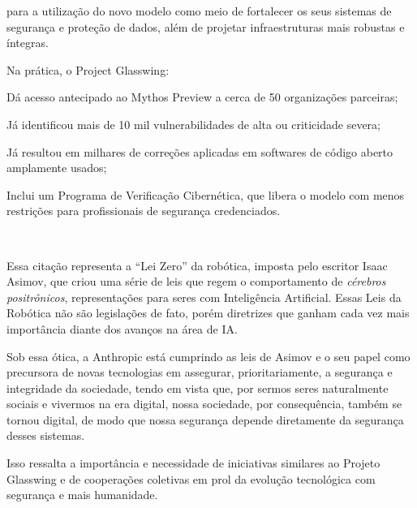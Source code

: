 {para a utilização do novo modelo como meio de fortalecer os seus sistemas de segurança e proteção de dados, além de projetar infraestruturas mais robustas e íntegras.


Na prática, o Project Glasswing:

\begin{hypeitemize}
\item Dá acesso antecipado ao Mythos Preview a cerca de 50 organizações parceiras;
\item Já identificou mais de 10 mil vulnerabilidades de alta ou criticidade severa;
\item Já resultou em milhares de correções aplicadas em softwares de código aberto amplamente usados;
\item Inclui um Programa de Verificação Cibernética, que libera o modelo com menos restrições para profissionais de segurança credenciados.
\end{hypeitemize}\
  
\subtitle{Uma reflexão inspirada em Asimov}


Essa citação representa a ``Lei Zero'' da robótica, imposta pelo escritor Isaac Asimov, que criou uma série de leis que regem o comportamento de \textit{cérebros positrônicos}, representações para seres com Inteligência Artificial. Essas Leis da Robótica não são legislações de fato, porém diretrizes que ganham cada vez mais importância diante dos avanços na área de IA.

Sob essa ótica, a Anthropic está cumprindo as leis de Asimov e o seu papel como precursora de novas tecnologias em assegurar, prioritariamente, a segurança e integridade da sociedade, tendo em vista que, por sermos seres naturalmente sociais e vivermos na era digital, nossa sociedade, por consequência, também se tornou digital, de modo que nossa segurança depende diretamente da segurança desses sistemas.

Isso ressalta a importância e necessidade de iniciativas similares ao Projeto Glasswing e de cooperações coletivas em prol da evolução tecnológica com segurança e mais humanidade.


}